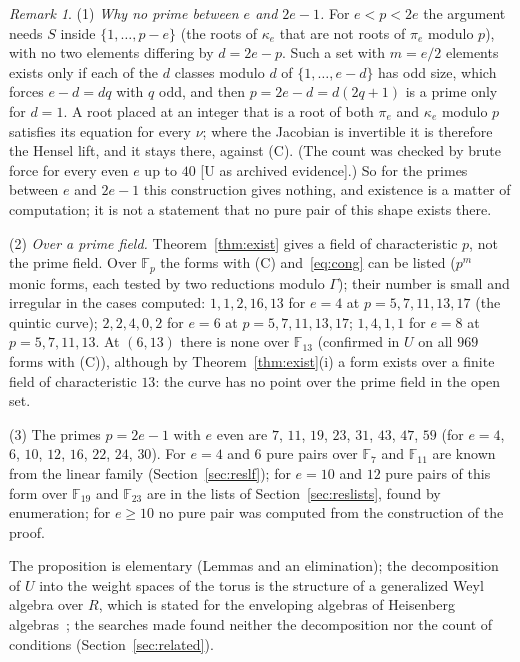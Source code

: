 \documentclass[11pt]{article}
\theoremstyle{definition}
\theoremstyle{remark}
\newtheorem{remark}{Remark}
\newcommand{\F}{\mathbb{F}}
\begin{document}
\begin{remark}\label{rem:exist}
(1) \emph{Why no prime between $e$ and $2e-1$.} For $e<p<2e$ the argument needs $S$ inside $\{1,\dots,p-e\}$ (the roots of $\kappa_e$ that are not roots of $\pi_e$ modulo $p$), with no two elements differing by $d=2e-p$. Such a set with $m=e/2$ elements exists only if each of the $d$ classes modulo $d$ of $\{1,\dots,e-d\}$ has odd size, which forces $e-d=dq$ with $q$ odd, and then $p=2e-d=d(2q+1)$ is a prime only for $d=1$. A root placed at an integer that is a root of both $\pi_e$ and $\kappa_e$ modulo $p$ satisfies its equation for every $\nu$; where the Jacobian is invertible it is therefore the Hensel lift, and it stays there, against (C). (The count was checked by brute force for every even $e$ up to $40$ [U as archived evidence].) So for the primes between $e$ and $2e-1$ this construction gives nothing, and existence is a matter of computation; it is not a statement that no pure pair of this shape exists there.

(2) \emph{Over a prime field.} Theorem~\ref{thm:exist} gives a field of characteristic $p$, not the prime field. Over $\F_p$ the forms with (C) and~\eqref{eq:cong} can be listed ($p^m$ monic forms, each tested by two reductions modulo $\Gamma$); their number is small and irregular in the cases computed: $1,1,2,16,13$ for $e=4$ at $p=5,7,11,13,17$ (the quintic curve); $2,2,4,0,2$ for $e=6$ at $p=5,7,11,13,17$; $1,4,1,1$ for $e=8$ at $p=5,7,11,13$. At $(6,13)$ there is none over $\F_{13}$ (confirmed in $U$ on all $969$ forms with (C)), although by Theorem~\ref{thm:exist}(i) a form exists over a finite field of characteristic $13$: the curve has no point over the prime field in the open set.

(3) The primes $p=2e-1$ with $e$ even are $7$, $11$, $19$, $23$, $31$, $43$, $47$, $59$ (for $e=4$, $6$, $10$, $12$, $16$, $22$, $24$, $30$). For $e=4$ and $6$ pure pairs over $\F_7$ and $\F_{11}$ are known from the linear family (Section~\ref{sec:reslf}); for $e=10$ and $12$ pure pairs of this form over $\F_{19}$ and $\F_{23}$ are in the lists of Section~\ref{sec:reslists}, found by enumeration; for $e\ge10$ no pure pair was computed from the construction of the proof.
\end{remark}

The proposition is elementary (Lemmas and an elimination); the decomposition of $U$ into the weight spaces of the torus is the structure of a generalized Weyl algebra over $R$, which is stated for the enveloping algebras of Heisenberg algebras~\cite{BenkartOndrus}; the searches made found neither the decomposition nor the count of conditions (Section~\ref{sec:related}).
\end{document}

